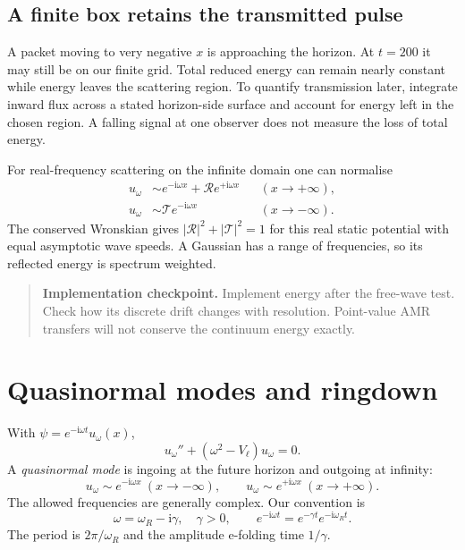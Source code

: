 \documentclass[11pt,a4paper]{article}
\numberwithin{equation}{section}
\newenvironment{checkpoint}{\begin{quote}\small\textbf{Implementation checkpoint.} }{\end{quote}}
\newcommand{\ii}{\mathrm{i}}
\begin{document}
\subsection{A finite box retains the transmitted pulse}
A packet moving to very negative $x$ is approaching the horizon. At $t=200$
it may still be on our finite grid. Total reduced energy can remain nearly
constant while energy leaves the scattering region. To quantify
transmission later, integrate inward flux across a stated horizon-side
surface and account for energy left in the chosen region. A falling signal
at one observer does not measure the loss of total energy.

For real-frequency scattering on the infinite domain one can normalise
\begin{align}
 u_\omega&\sim e^{-\ii\omega x}+\mathcal R e^{+\ii\omega x}
                       &&(x\to+\infty),\\
 u_\omega&\sim\mathcal T e^{-\ii\omega x} &&(x\to-\infty).
\end{align}
The conserved Wronskian gives $|\mathcal R|^2+|\mathcal T|^2=1$ for this
real static potential with equal asymptotic wave speeds. A Gaussian has a
range of frequencies, so its reflected energy is spectrum weighted.

\begin{checkpoint}
Implement energy after the free-wave test. Check how its discrete drift
changes with resolution. Point-value AMR transfers will not conserve the
continuum energy exactly.
\end{checkpoint}

\section{Quasinormal modes and ringdown}\label{sec:qnm}

With $\psi=e^{-\ii\omega t}u_\omega(x)$,
\begin{equation}
 u_\omega''+(\omega^2-V_\ell)u_\omega=0 .
\end{equation}
A \emph{quasinormal mode} is ingoing at the future horizon and outgoing
at infinity:
\begin{equation}\label{eq:qnmconditions}
 u_\omega\sim e^{-\ii\omega x}\ (x\to-\infty),\qquad
 u_\omega\sim e^{+\ii\omega x}\ (x\to+\infty).
\end{equation}
The allowed frequencies are generally complex. Our convention is
\begin{equation}
 \omega=\omega_R-\ii\gamma,\quad\gamma>0,\qquad
 e^{-\ii\omega t}=e^{-\gamma t}e^{-\ii\omega_Rt}.
\end{equation}
The period is $2\pi/\omega_R$ and the amplitude e-folding time $1/\gamma$.
\end{document}
